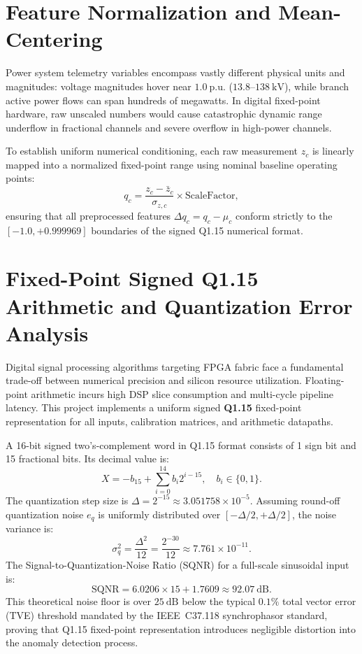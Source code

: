 \documentclass[11pt,a4paper]{report}
\begin{document}
\section{Feature Normalization and Mean-Centering}
Power system telemetry variables encompass vastly different physical units and magnitudes:
voltage magnitudes hover near $1.0~\text{p.u.}$ ($13.8\text{--}138~\text{kV}$), while branch
active power flows can span hundreds of megawatts. In digital fixed-point hardware, raw
unscaled numbers would cause catastrophic dynamic range underflow in fractional channels
and severe overflow in high-power channels.

To establish uniform numerical conditioning, each raw measurement $z_c$ is linearly mapped
into a normalized fixed-point range using nominal baseline operating points:
\begin{equation}
q_c = \frac{z_c - \bar{z}_c}{\sigma_{z,c}} \times \text{ScaleFactor},
\end{equation}
ensuring that all preprocessed features $\Delta q_c = q_c - \mu_c$ conform strictly to the
$[-1.0, +0.999969]$ boundaries of the signed Q1.15 numerical format.

\section{Fixed-Point Signed Q1.15 Arithmetic and Quantization Error Analysis}
Digital signal processing algorithms targeting FPGA fabric face a fundamental trade-off
between numerical precision and silicon resource utilization. Floating-point arithmetic
incurs high DSP slice consumption and multi-cycle pipeline latency. This project implements
a uniform signed \textbf{Q1.15} fixed-point representation for all inputs, calibration
matrices, and arithmetic datapaths.

A 16-bit signed two's-complement word in Q1.15 format consists of 1 sign bit and 15 fractional
bits. Its decimal value is:
\begin{equation}
X = -b_{15} + \sum_{i=0}^{14} b_i 2^{i - 15}, \quad b_i \in \{0, 1\}.
\end{equation}
The quantization step size is $\Delta = 2^{-15} \approx 3.051758 \times 10^{-5}$. Assuming
round-off quantization noise $e_q$ is uniformly distributed over $[-\Delta/2, +\Delta/2]$,
the noise variance is:
\begin{equation}
\sigma_q^2 = \frac{\Delta^2}{12} = \frac{2^{-30}}{12} \approx 7.761 \times 10^{-11}.
\end{equation}
The Signal-to-Quantization-Noise Ratio (SQNR) for a full-scale sinusoidal input is:
\begin{equation}
\text{SQNR} = 6.0206 \times 15 + 1.7609 \approx 92.07~\text{dB}.
\end{equation}
This theoretical noise floor is over $25~\text{dB}$ below the typical $0.1\%$ total vector
error (TVE) threshold mandated by the IEEE~C37.118 synchrophasor standard, proving that Q1.15
fixed-point representation introduces negligible distortion into the anomaly detection process.
\end{document}
